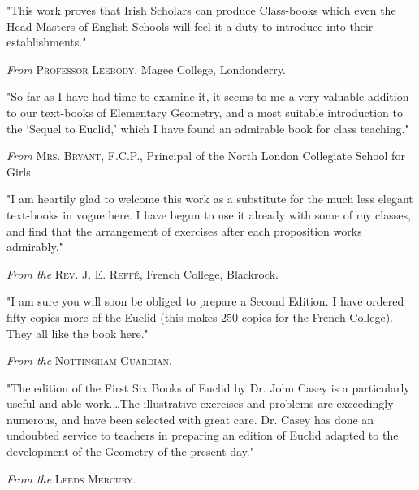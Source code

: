\documentclass[oneside]{book}
\begin{document}
\begin{footnotesize}
"This work proves that Irish Scholars can produce Class-books
which even the Head Masters of English Schools will feel it a
duty to introduce into their establishments."

\medskip
\begin{center}
\textit{From} \textsc{Professor Leebody}, Magee College, Londonderry.
\end{center}
\nopagebreak

"So far as I have had time to examine it, it seems to me a
very valuable addition to our text-books of Elementary Geometry,
and a most suitable introduction to the `Sequel to Euclid,' which
I have found an admirable book for class teaching."

\medskip
\begin{center}
\textit{From} \textsc{Mrs. Bryant}, F.C.P., Principal of the North London Collegiate
School for Girls.
\end{center}
\nopagebreak

"I am heartily glad to welcome this work as a substitute for
the much less elegant text-books in vogue here. I have begun
to use it already with some of my classes, and find that the
arrangement of exercises after each proposition works admirably."

\medskip
\begin{center}
\textit{From the} \textsc{Rev. J. E. Reffé}, French College, Blackrock.
\end{center}
\nopagebreak

"I am sure you will soon be obliged to prepare a Second
Edition. I have ordered fifty copies more of the Euclid (this
makes 250 copies for the French College). They all like the book
here."

\medskip
\begin{center}
\textit{From the} \textsc{Nottingham Guardian}.
\end{center}
\nopagebreak

"The edition of the First Six Books of Euclid by Dr. John
Casey is a particularly useful and able work.\ldots The illustrative
exercises and problems are exceedingly numerous, and
have been selected with great care. Dr. Casey has done an
undoubted service to teachers in preparing an edition of Euclid
adapted to the development of the Geometry of the present day."


\medskip
\begin{center}
\textit{From the} \textsc{Leeds Mercury}.
\end{center}
\nopagebreak


\end{footnotesize}
\end{document}
